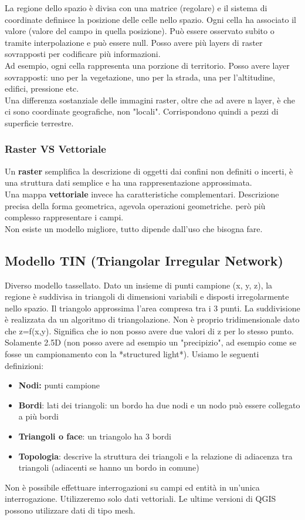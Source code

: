 \documentclass[a4paper,12pt]{article}
\begin{document}
La regione dello spazio è divisa con una matrice (regolare) e il sistema di coordinate definisce la posizione delle celle nello spazio. Ogni cella ha associato il valore (valore del campo in quella posizione). Può essere osservato subito o tramite interpolazione e può essere null. Posso avere più layers di raster sovrapposti per codificare più informazioni.\\
Ad esempio, ogni cella rappresenta una porzione di territorio. Posso avere layer sovrapposti: uno per la vegetazione, uno per la strada, una per l'altitudine, edifici, pressione etc.\\
Una differenza sostanziale delle immagini raster, oltre che ad avere n layer, è che ci sono coordinate geografiche, non "locali". Corrispondono quindi a pezzi di superficie terrestre.

\subsubsection{Raster VS Vettoriale}
Un \textbf{raster} semplifica la descrizione di oggetti dai confini non definiti o incerti, è una struttura dati semplice e ha una rappresentazione approssimata.\\
Una mappa \textbf{vettoriale} invece ha caratteristiche complementari. Descrizione precisa della forma geometrica, agevola operazioni geometriche. \E però più complesso rappresentare i campi.\\
Non esiste un modello migliore, tutto dipende dall'uso che bisogna fare.

\subsection{Modello TIN (Triangolar Irregular Network)}

Diverso modello tassellato. Dato un insieme di punti campione (x, y, z), la regione è suddivisa in triangoli di dimensioni variabili e disposti irregolarmente nello spazio. Il triangolo approssima l'area compresa tra i 3 punti.
La suddivisione è realizzata da un algoritmo di triangolazione.
Non è proprio tridimensionale dato che z=f(x,y). Significa che io non posso avere due valori di z per lo stesso punto. Solamente 2.5D (non posso avere ad esempio un "precipizio", ad esempio come se fosse un campionamento con la *structured light*).
Usiamo le seguenti definizioni:
\begin{itemize}
\item \textbf{Nodi:} punti campione
\item \textbf{Bordi}: lati dei triangoli: un bordo ha due nodi e un nodo può essere collegato a più bordi
\item \textbf{Triangoli o face}: un triangolo ha 3 bordi
\item \textbf{Topologia}: descrive la struttura dei triangoli e la relazione di adiacenza tra triangoli (adiacenti se hanno un bordo in comune)
\end{itemize}
Non è possibile effettuare interrogazioni su campi ed entità in un'unica interrogazione. Utilizzeremo solo dati vettoriali. Le ultime versioni di QGIS possono utilizzare dati di tipo mesh.
\end{document}

